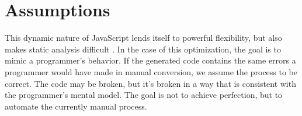 \section{Assumptions}

This dynamic nature of JavaScript lends itself to powerful flexibility, but also makes static analysis difficult \cite{staticanalysis12}.  In the case of this optimization, the goal is to mimic a programmer's behavior.  If the generated code contains the same errors a programmer would have made in manual conversion, we assume the process to be correct.  The code may be broken, but it's broken in a way that is consistent with the programmer's mental model.  The goal is not to achieve perfection, but to automate the currently manual process.  




